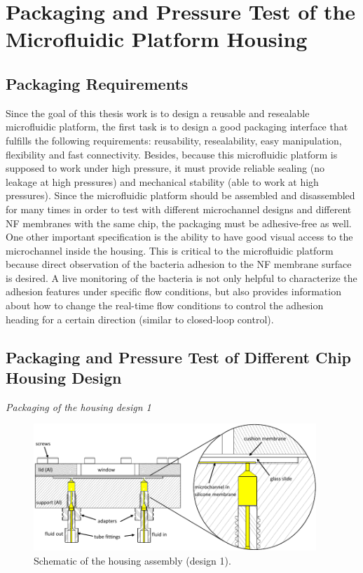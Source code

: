 \section{Packaging and Pressure Test of the Microfluidic Platform Housing}
\label{4_2}
\subsection{Packaging Requirements}
\label{4_2_1}
Since the goal of this thesis work is to design a reusable and resealable microfluidic platform, the first task is to design a good packaging interface that fulfills the following requirements: reusability, resealability, easy manipulation, flexibility and fast connectivity. Besides, because this microfluidic platform is supposed to work under high pressure, it must provide reliable sealing (no leakage at high pressures) and mechanical stability (able to work at high pressures). Since the microfluidic platform should be assembled and disassembled for many times in order to test with different microchannel designs and different NF membranes with the same chip, the packaging must be adhesive-free as well.\\

One other important specification is the ability to have good visual access to the microchannel inside the housing. This is critical to the microfluidic platform because direct observation of the bacteria adhesion to the NF membrane surface is desired. A live monitoring of the bacteria is not only helpful to characterize the adhesion features under specific flow conditions, but also provides information about how to change the real-time flow conditions to control the adhesion heading for a certain direction (similar to closed-loop control). 

\subsection{Packaging and Pressure Test of Different Chip Housing Design}
\label{4_2_2}
\noindent \textit{Packaging of the housing design 1}\\

\begin{figure}[h]%
\centering
\includegraphics[width=0.95\textwidth]{figures/packagingandtestunderhighpressure/figure4_5}%
\caption{Schematic of the housing assembly (design 1).}%
\label{figure4_5}%
\end{figure}

